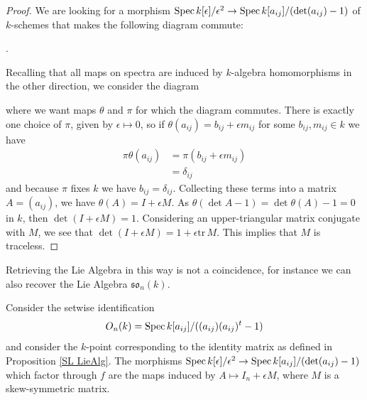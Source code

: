\begin{proof}
We are looking for a morphism $\operatorname{Spec} k[\epsilon]/\epsilon^2 \to \operatorname{Spec} k[a_{ij}]/(\det (a_{ij}) - 1)$ of \(k\)-schemes that makes the following diagram commute:
\begin{center}
.
\end{center}
Recalling that all maps on spectra are induced by \(k\)-algebra homomorphisms in the other direction, we consider the diagram
\begin{center}
\end{center}
where we want maps $\theta$ and $\pi$ for which the diagram commutes.
There is exactly one choice of $\pi$, given by $\epsilon \mapsto 0$, so if $\theta(a_{ij}) = b_{ij} + \epsilon m_{ij}$ for some $b_{ij}, m_{ij} \in k$ we have
\begin{align*}
\pi \theta (a_{ij})
&=
\pi(b_{ij} + \epsilon m_{ij})\\
&=
\delta_{ij}
\end{align*}
and because $\pi$ fixes $k$ we have $b_{ij} = \delta_{ij}$. Collecting these terms into a matrix $A = (a_{ij})$, we have $\theta(A) = I + \epsilon M$. As $\theta(\det A - 1) = \det \theta(A) - 1 = 0$ in $k$, then $\det(I + \epsilon M) = 1$. Considering an upper-triangular matrix conjugate with $M$, we see that $\det(I + \epsilon M) = 1 + \epsilon \text{tr}\, M$. This implies that $M$ is traceless.
\end{proof}

Retrieving the Lie Algebra in this way is not a coincidence, for instance we can also recover the Lie Algebra $\mathfrak{so}_n(k)$.

\begin{proposition}
Consider the setwise identification
\[
O_n(k) = \operatorname{Spec} k[a_{ij}]/((a_{ij})(a_{ij})^t - 1)
\]
and consider the $k$-point corresponding to the identity matrix as defined in Proposition \ref{SL LieAlg}. The morphisms $\operatorname{Spec} k[\epsilon]/\epsilon^2 \to \operatorname{Spec} k[a_{ij}]/(\det (a_{ij}) - 1)$ which factor through $f$ are the maps induced by $A \mapsto I_n + \epsilon M$, where $M$ is a skew-symmetric matrix.
\end{proposition}

